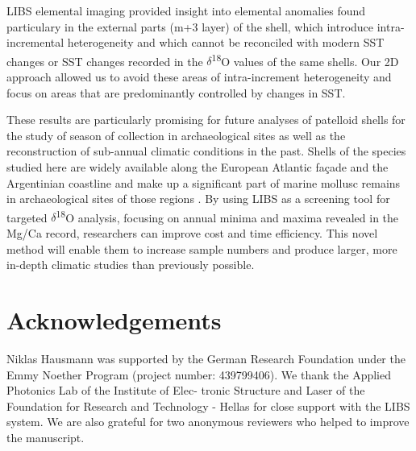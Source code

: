 \documentclass[
  authoryear,
  preprint,
  3p]{elsarticle}
\begin{document}
LIBS elemental imaging provided insight into elemental anomalies found
particulary in the external parts (m+3 layer) of the shell, which
introduce intra-incremental heterogeneity and which cannot be reconciled
with modern SST changes or SST changes recorded in the
\(\delta\)\textsuperscript{18}O values of the same shells. Our 2D
approach allowed us to avoid these areas of intra-increment
heterogeneity and focus on areas that are predominantly controlled by
changes in SST.

These results are particularly promising for future analyses of
patelloid shells for the study of season of collection in archaeological
sites as well as the reconstruction of sub-annual climatic conditions in
the past. Shells of the species studied here are widely available along
the European Atlantic façade and the Argentinian coastline and make up a
significant part of marine mollusc remains in archaeological sites of
those regions
\citep{Colonese2011-ab, Villagran2011-ld, Zangrando2016-yl}. By using
LIBS as a screening tool for targeted \(\delta\)\textsuperscript{18}O
analysis, focusing on annual minima and maxima revealed in the Mg/Ca
record, researchers can improve cost and time efficiency. This novel
method will enable them to increase sample numbers and produce larger,
more in-depth climatic studies than previously possible.

\section{Acknowledgements}\label{acknowledgements}

Niklas Hausmann was supported by the German Research Foundation under
the Emmy Noether Program (project number: 439799406). We thank the
Applied Photonics Lab of the Institute of Elec- tronic Structure and
Laser of the Foundation for Research and Technology - Hellas for close
support with the LIBS system. We are also grateful for two anonymous
reviewers who helped to improve the manuscript.


  
\end{document}
